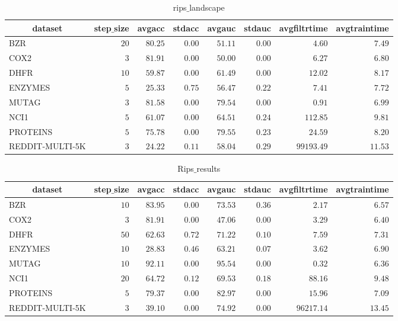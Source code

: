 \documentclass[]{article}
\begin{document}
\begin{table}[!tbp]
\caption{rips$\_$landscape\label{rips_landscape}} 
{\centering
\begin{tabular}{lrrrrrrr}
\hline\hline
\multicolumn{1}{c}{dataset}&\multicolumn{1}{c}{step$\_$size}&\multicolumn{1}{c}{avgacc}&\multicolumn{1}{c}{stdacc}&\multicolumn{1}{c}{avgauc}&\multicolumn{1}{c}{stdauc}&\multicolumn{1}{c}{avgfiltrtime}&\multicolumn{1}{c}{avgtraintime}\tabularnewline
\hline
BZR&$20$&$80.25$&$0.00$&$51.11$&$0.00$&$    4.60$&$ 7.49$\tabularnewline
COX2&$ 3$&$81.91$&$0.00$&$50.00$&$0.00$&$    6.27$&$ 6.80$\tabularnewline
DHFR&$10$&$59.87$&$0.00$&$61.49$&$0.00$&$   12.02$&$ 8.17$\tabularnewline
ENZYMES&$ 5$&$25.33$&$0.75$&$56.47$&$0.22$&$    7.41$&$ 7.72$\tabularnewline
MUTAG&$ 3$&$81.58$&$0.00$&$79.54$&$0.00$&$    0.91$&$ 6.99$\tabularnewline
NCI1&$ 5$&$61.07$&$0.00$&$64.51$&$0.24$&$  112.85$&$ 9.81$\tabularnewline
PROTEINS&$ 5$&$75.78$&$0.00$&$79.55$&$0.23$&$   24.59$&$ 8.20$\tabularnewline
REDDIT-MULTI-5K&$ 3$&$24.22$&$0.11$&$58.04$&$0.29$&$99193.49$&$11.53$\tabularnewline
\hline
\end{tabular}}
\end{table}
\begin{table}[!tbp]
\caption{Rips$\_$results\label{Rips_results}} 
{\centering
\begin{tabular}{lrrrrrrr}
\hline\hline
\multicolumn{1}{c}{dataset}&\multicolumn{1}{c}{step$\_$size}&\multicolumn{1}{c}{avgacc}&\multicolumn{1}{c}{stdacc}&\multicolumn{1}{c}{avgauc}&\multicolumn{1}{c}{stdauc}&\multicolumn{1}{c}{avgfiltrtime}&\multicolumn{1}{c}{avgtraintime}\tabularnewline
\hline
BZR&$10$&$83.95$&$0.00$&$73.53$&$0.36$&$    2.17$&$ 6.57$\tabularnewline
COX2&$ 3$&$81.91$&$0.00$&$47.06$&$0.00$&$    3.29$&$ 6.40$\tabularnewline
DHFR&$50$&$62.63$&$0.72$&$71.22$&$0.10$&$    7.59$&$ 7.31$\tabularnewline
ENZYMES&$10$&$28.83$&$0.46$&$63.21$&$0.07$&$    3.62$&$ 6.90$\tabularnewline
MUTAG&$10$&$92.11$&$0.00$&$95.54$&$0.00$&$    0.32$&$ 6.36$\tabularnewline
NCI1&$20$&$64.72$&$0.12$&$69.53$&$0.18$&$   88.16$&$ 9.48$\tabularnewline
PROTEINS&$ 5$&$79.37$&$0.00$&$82.97$&$0.00$&$   15.96$&$ 7.09$\tabularnewline
REDDIT-MULTI-5K&$ 3$&$39.10$&$0.00$&$74.92$&$0.00$&$96217.14$&$13.45$\tabularnewline
\hline
\end{tabular}}
\end{table}
\end{document}
